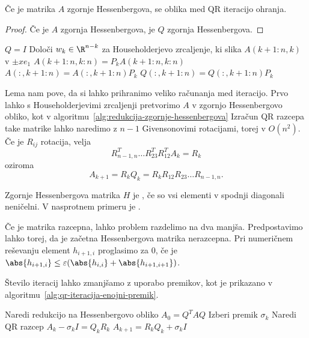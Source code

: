 \begin{lema}
  Če je matrika $A$ zgornje Hessenbergova, se oblika med QR iteracijo ohranja.
\end{lema}

\begin{proof}
  Če je $A$ zgornja Hessenbergova, je $Q$ zgornja Hessenbergova.
\end{proof}

\begin{algorithm}
  \caption{Redukcija matrike v zgornje Hessenbergovo obliko}
  \label{alg:redukcija-zgornje-hessenbergova}
  \begin{algorithmic}
	\State $Q = I$
	\State Določi $w_k \in \R^{n-k}$ za Householderjevo zrcaljenje, ki slika
	$A(k+1:n,k)$ v $\pm x e_1$
	\State $A(k+1:n,k:n) = P_k A(k+1:n,k:n)$
	\State $A(:,k+1:n) = A(:,k+1:n) P_k$
	\State $Q(:,k+1:n) = Q(:,k+1:n) P_k$
	\EndFor
  \end{algorithmic}
\end{algorithm}

Lema nam pove, da si lahko prihranimo veliko računanja med iteracijo.
Prvo lahko s Householderjevimi zrcaljenji pretvorimo $A$ v zgornjo Hessenbergovo
obliko, kot v algoritmu~\ref{alg:redukcija-zgornje-hessenbergova}
Izračun QR razcepa take matrike lahko naredimo z $n-1$ Givensonovimi rotacijami,
torej v $O(n^2)$.
Če je $R_{ij}$ rotacija, velja
\[
  R_{n-1,n}^T \ldots R_{23}^T R_{12}^T A_k = R_k
\]
oziroma
\[
  A_{k+1} = R_k Q_k = R_k R_{12} R_{23} \ldots R_{n-1,n}.
\]


\begin{definicija}
  Zgornje Hessenbergova matrika $H$ je , če so vsi elementi v
  spodnji diagonali neničelni.
  V nasprotnem primeru je .
\end{definicija}

Če je matrika razcepna, lahko problem razdelimo na dva manjša.
Predpostavimo lahko torej, da je začetna Hessenbergova matrika nerazcepna.
Pri numeričnem reševanju element $h_{i+1,i}$ proglasimo za $0$, če je
$\abs{h_{i+1,i}} \le \varepsilon (\abs{h_{i,i}} + \abs{h_{i+1,i+1}})$.

Število iteracij lahko zmanjšamo z uporabo premikov, kot je prikazano v
algoritmu~\ref{alg:qr-iteracija-enojni-premik}.

\begin{algorithm}
  \caption{QR iteracija z enojnim premikom}
  \label{alg:qr-iteracija-enojni-premik}
  \begin{algorithmic}
	\State Naredi redukcijo na Hessenbergovo obliko $A_0 = Q^T A Q$
	\State Izberi premik $\sigma_k$
	\State Naredi QR razcep $A_k - \sigma_k I = Q_k R_k$
	\State $A_{k+1} = R_k Q_k + \sigma_k I$
	\EndFor
  \end{algorithmic}
\end{algorithm}

